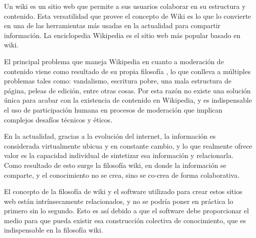 

Un wiki es un sitio web que permite a sus usuarios colaborar en su estructura y contenido. Esta versatilidad que provee el concepto de Wiki es lo que lo convierte en una de las herramientas más usadas en la actualidad para compartir información. La enciclopedia Wikipedia es el sitio web más popular basado en wiki.

El principal problema que maneja Wikipedia en cuanto a moderación de contenido viene como resultado de su propia filosofía , lo que conlleva a múltiples problemas tales como: vandalismo, escritura pobre, una mala estructura de página, peleas de edición, entre otras cosas. Por esta razón no existe una solución única para acabar con la existencia de  contenido en Wikipedia, y es indispensable el uso de participación humana en procesos de moderación que implican complejos desafíos técnicos y éticos.

En la actualidad, gracias a la evolución del internet, la información es considerada virtualmente ubicua y en constante cambio, y lo que realmente ofrece valor es la capacidad individual de sintetizar esa información y relacionarla.
Como resultado de esto surge la filosofía wiki, en donde la información se comparte, y el conocimiento no se crea, sino se co-crea de forma colaborativa.

El concepto de la filosofía de wiki y el software utilizado para crear estos sitios web están intrínsecamente relacionados, y no se podría poner en práctica lo primero sin lo segundo. Esto es así debido a que el software debe proporcionar el medio para que pueda existir esa construcción colectiva de conocimiento, que es indispensable en la filosofía wiki.



